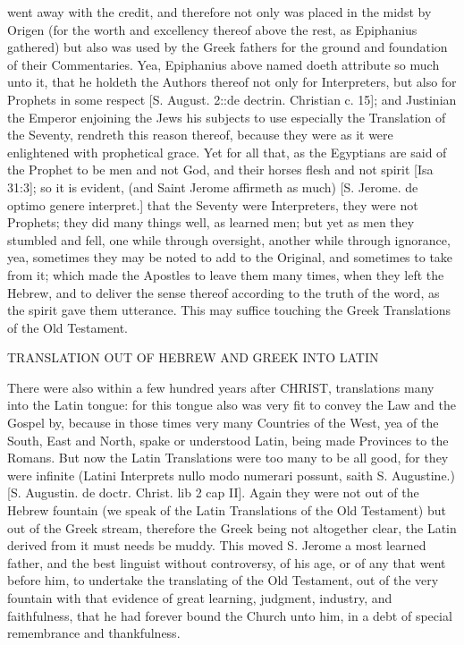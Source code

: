 {went away with the credit, and therefore not only was placed in the midst by Origen (for the worth and excellency thereof above the rest, as Epiphanius gathered) but also was used by the Greek fathers for the ground and foundation of their Commentaries. Yea, Epiphanius above named doeth attribute so much unto it, that he holdeth the Authors thereof not only for Interpreters, but also for Prophets in some respect [S. August. 2::de dectrin. Christian c. 15]; and Justinian the Emperor enjoining the Jews his subjects to use especially the Translation of the Seventy, rendreth this reason thereof, because they were as it were enlightened with prophetical grace. Yet for all that, as the Egyptians are said of the Prophet to be men and not God, and their horses flesh and not spirit [Isa 31:3]; so it is evident, (and Saint Jerome affirmeth as much) [S. Jerome. de optimo genere interpret.] that the Seventy were Interpreters, they were not Prophets; they did many things well, as learned men; but yet as men they stumbled and fell, one while through oversight, another while through ignorance, yea, sometimes they may be noted to add to the Original, and sometimes to take from it; which made the Apostles to leave them many times, when they left the Hebrew, and to deliver the sense thereof according to the truth of the word, as the spirit gave them utterance. This may suffice touching the Greek Translations of the Old Testament.
\par }{\IS TRANSLATION OUT OF HEBREW AND GREEK INTO LATIN
\par }{\IP There were also within a few hundred years after CHRIST, translations many into the Latin tongue: for this tongue also was very fit to convey the Law and the Gospel by, because in those times very many Countries of the West, yea of the South, East and North, spake or understood Latin, being made Provinces to the Romans. But now the Latin Translations were too many to be all good, for they were infinite (Latini Interprets nullo modo numerari possunt, saith S. Augustine.) [S. Augustin. de doctr. Christ. lib 2 cap II]. Again they were not out of the Hebrew fountain (we speak of the Latin Translations of the Old Testament) but out of the Greek stream, therefore the Greek being not altogether clear, the Latin derived from it must needs be muddy. This moved S. Jerome a most learned father, and the best linguist without controversy, of his age, or of any that went before him, to undertake the translating of the Old Testament, out of the very fountain with that evidence of great learning, judgment, industry, and faithfulness, that he had forever bound the Church unto him, in a debt of special remembrance and thankfulness.
}
